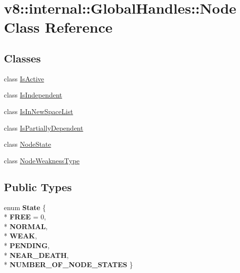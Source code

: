 \hypertarget{classv8_1_1internal_1_1_global_handles_1_1_node}{}\section{v8\+:\+:internal\+:\+:Global\+Handles\+:\+:Node Class Reference}
\label{classv8_1_1internal_1_1_global_handles_1_1_node}
\subsection*{Classes}
\begin{DoxyCompactItemize}
\item 
class \hyperlink{classv8_1_1internal_1_1_global_handles_1_1_node_1_1_is_active}{Is\+Active}
\item 
class \hyperlink{classv8_1_1internal_1_1_global_handles_1_1_node_1_1_is_independent}{Is\+Independent}
\item 
class \hyperlink{classv8_1_1internal_1_1_global_handles_1_1_node_1_1_is_in_new_space_list}{Is\+In\+New\+Space\+List}
\item 
class \hyperlink{classv8_1_1internal_1_1_global_handles_1_1_node_1_1_is_partially_dependent}{Is\+Partially\+Dependent}
\item 
class \hyperlink{classv8_1_1internal_1_1_global_handles_1_1_node_1_1_node_state}{Node\+State}
\item 
class \hyperlink{classv8_1_1internal_1_1_global_handles_1_1_node_1_1_node_weakness_type}{Node\+Weakness\+Type}
\end{DoxyCompactItemize}
\subsection*{Public Types}
\begin{DoxyCompactItemize}
\item 
enum {\bfseries State} \{ \\*
{\bfseries F\+R\+EE} = 0, 
\\*
{\bfseries N\+O\+R\+M\+AL}, 
\\*
{\bfseries W\+E\+AK}, 
\\*
{\bfseries P\+E\+N\+D\+I\+NG}, 
\\*
{\bfseries N\+E\+A\+R\+\_\+\+D\+E\+A\+TH}, 
\\*
{\bfseries N\+U\+M\+B\+E\+R\+\_\+\+O\+F\+\_\+\+N\+O\+D\+E\+\_\+\+S\+T\+A\+T\+ES}
 \}\hypertarget{classv8_1_1internal_1_1_global_handles_1_1_node_ad0e78c1f3196c693801bcac55e643acb}{}\label{classv8_1_1internal_1_1_global_handles_1_1_node_ad0e78c1f3196c693801bcac55e643acb}

\end{DoxyCompactItemize}
